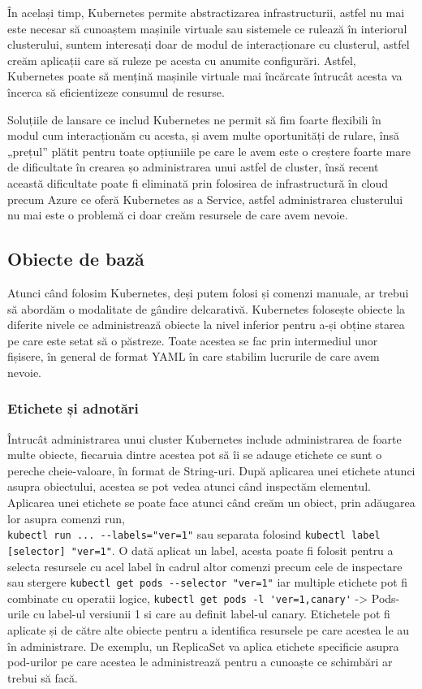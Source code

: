 În același timp, Kubernetes permite abstractizarea infrastructurii, astfel nu mai este 
necesar să cunoaștem mașinile virtuale sau sistemele ce rulează în interiorul clusterului,
suntem interesați doar de modul de interacționare cu clusterul, astfel creăm aplicații
care să ruleze pe acesta cu anumite configurări. Astfel, Kubernetes poate să mențină
mașinile virtuale mai încărcate întrucât acesta va încerca să eficientizeze consumul de resurse.

Soluțiile de lansare ce includ Kubernetes ne permit să fim foarte flexibili în modul
cum interacționăm cu acesta, și avem multe oportunități de rulare, însă „prețul”
plătit pentru toate opțiuniile pe care le avem este o creștere foarte mare 
de dificultate în crearea șo administrarea unui astfel de cluster, însă 
recent această dificultate poate fi eliminată prin folosirea de infrastructură 
în cloud precum Azure ce oferă Kubernetes as a Service, astfel administrarea clusterului
nu mai este o problemă ci doar creăm resursele de care avem nevoie.

\subsection{Obiecte de bază}

Atunci când folosim Kubernetes, deși putem folosi și comenzi manuale, ar trebui să 
abordăm o modalitate de gândire delcarativă. Kubernetes folosește obiecte la diferite 
nivele ce administrează obiecte la nivel inferior pentru a-și obține starea pe care 
este setat să o păstreze. Toate acestea se fac prin intermediul unor fișisere, 
în general de format YAML în care stabilim lucrurile de care avem nevoie. 

\subsubsection{Etichete și adnotări}

Întrucât administrarea unui cluster Kubernetes include administrarea de foarte multe obiecte,
fiecaruia dintre acestea pot să îi se adauge etichete ce sunt o pereche cheie-valoare,
în format de String-uri. După aplicarea unei etichete atunci asupra obiectului,
acestea se pot vedea atunci când inspectăm elementul. Aplicarea unei etichete se poate face
atunci când creăm un obiect, prin adăugarea lor asupra comenzi run,\\ \verb|kubectl run ... --labels="ver=1"|
sau separata folosind \verb|kubectl label [selector] "ver=1"|. O dată aplicat un label, 
acesta poate fi folosit pentru a selecta resursele cu acel label în cadrul altor comenzi 
precum cele de inspectare sau stergere \verb|kubectl get pods --selector "ver=1"| iar 
multiple etichete pot fi combinate cu operatii logice, \verb|kubectl get pods -l 'ver=1,canary'| ->
Pods-urile cu label-ul versiunii 1 si care au definit label-ul canary. Etichetele pot fi aplicate și de către alte obiecte 
pentru a identifica resursele pe care acestea le au în administrare. De exemplu, un ReplicaSet va aplica
etichete specificie asupra pod-urilor pe care acestea le administrează pentru a cunoaște ce schimbări
ar trebui să facă.

